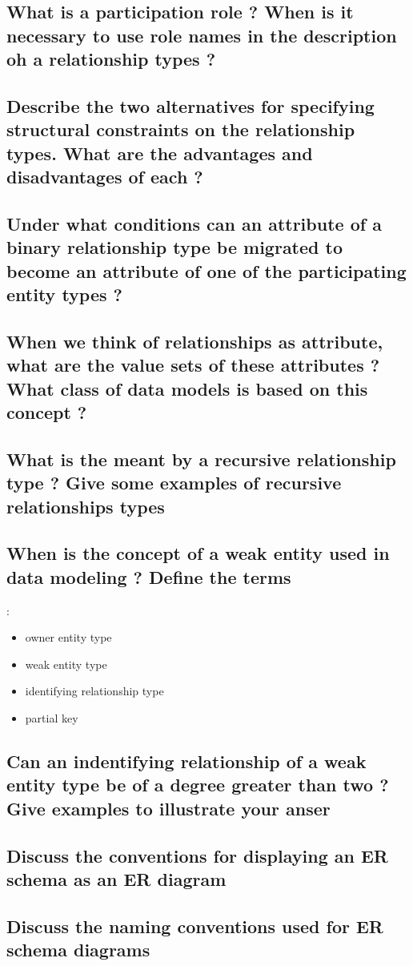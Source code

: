 \subsection{What is a participation role ? When is it necessary to use role names in the description oh a relationship types ?}

\subsection{Describe the two alternatives for specifying structural constraints on the relationship types. What are the advantages and disadvantages of each ?}

\subsection{Under what conditions can an attribute of a binary relationship type be migrated to become an attribute of one of the participating entity types ?}

\subsection{When we think of relationships as attribute, what are the value sets of these attributes ? What class of data models is based on this concept ?}

\subsection{What is the meant by a recursive relationship type ? Give some examples of recursive relationships types}

\subsection{When is the concept of a weak entity used in data modeling ? Define the terms} :
\begin{itemize}
	\item owner entity type
	\item weak entity type
	\item identifying relationship type
	\item partial key
\end{itemize}

\subsection{Can an indentifying relationship of a weak entity type be of a degree greater than two ? Give examples to illustrate your anser}

\subsection{Discuss the conventions for displaying an ER schema as an ER diagram}

\subsection{Discuss the naming conventions used for ER schema diagrams}

